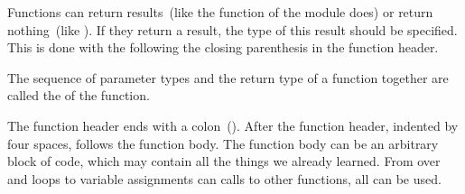 Functions can return results~(like the  function of the  module does) or return nothing~(like ).
If they return a result, the type of this result should be specified.
This is done with the  \pythonIdx{->} following the closing parenthesis in the function header.%
%
\begin{definition}[Signature]%
The sequence of parameter types and the return type of a function together are called the  of the function.%
\end{definition}%
%
The function header ends with a colon~(\pythonilIdx{:}).%
%
%
%
After the function header, indented by four spaces, follows the function body.%
%
%
%
The function body can be an arbitrary block of code, which may contain all the things we already learned.
From  over  and  loops to variable assignments can calls to other functions, all can be used.

